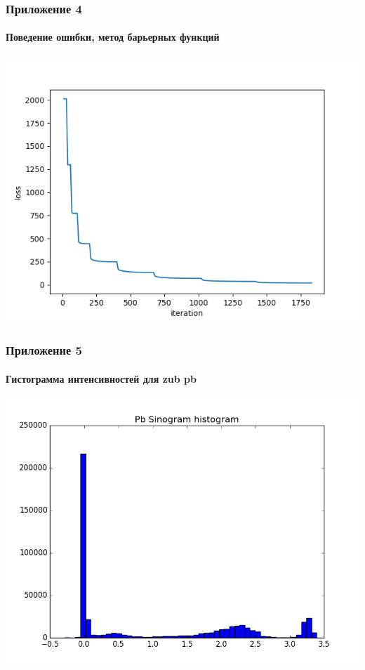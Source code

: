\documentclass[12pt]{beamer}
\begin{document}
\begin{frame}
\frametitle{Приложение 4}
\framesubtitle{Поведение ошибки, метод барьерных функций}
\includegraphics[width=1\textwidth]{loss_by_iter}
\end{frame}


\begin{frame}
\frametitle{Приложение 5}
\framesubtitle{Гистограмма интенсивностей для zub pb}
\includegraphics[width=1\textwidth]{../Dissertation/images/part2_img/pb_hist}
\end{frame}
\end{document}
